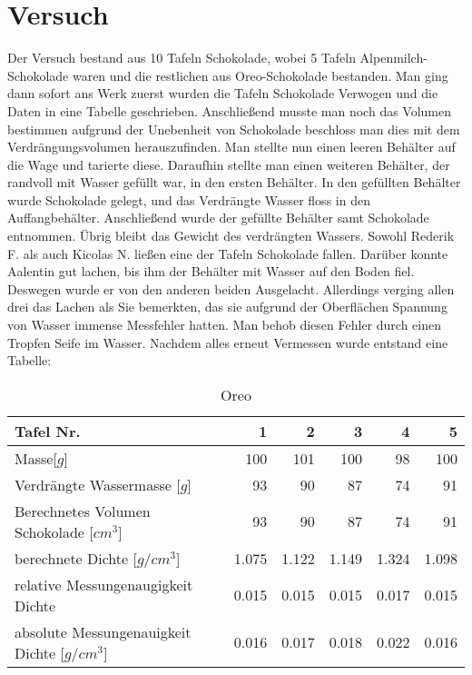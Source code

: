 \documentclass[12pt]{scrartcl}
\begin{document}
\section{Versuch}
Der Versuch bestand aus 10 Tafeln Schokolade, wobei 5 Tafeln Alpenmilch-Schokolade waren und die restlichen aus Oreo-Schokolade bestanden. Man ging dann sofort ans Werk zuerst wurden die Tafeln Schokolade Verwogen und die Daten in eine Tabelle geschrieben. Anschließend musste man noch das Volumen bestimmen aufgrund der Unebenheit von Schokolade beschloss man dies mit dem Verdrängungsvolumen herauszufinden. Man stellte nun einen leeren Behälter auf die Wage und tarierte diese. Daraufhin stellte man einen weiteren Behälter, der randvoll mit Wasser gefüllt war, in den ersten Behälter. In den gefüllten Behälter wurde Schokolade gelegt, und das Verdrängte Wasser floss in den Auffangbehälter. Anschließend wurde der gefüllte Behälter samt Schokolade entnommen. Übrig bleibt das Gewicht des verdrängten Wassers. Sowohl Rederik F. als auch Kicolas N. ließen eine der Tafeln Schokolade fallen. Darüber konnte Aalentin gut lachen, bis ihm der Behälter mit Wasser auf den Boden fiel. Deswegen wurde er von den anderen beiden Ausgelacht. Allerdings verging allen drei das Lachen als Sie bemerkten, das sie aufgrund der Oberflächen Spannung von Wasser immense Messfehler hatten. Man behob diesen Fehler durch einen Tropfen Seife im Wasser. Nachdem alles erneut Vermessen wurde entstand eine Tabelle:
	\begin{table}[h!]
	  \center
	  \caption{Oreo}
      \label{tab:oreo}	  
      \begin{tabular}{l|r|r|r|r|r}
      \toprule
      Tafel Nr. & 1 & 2 & 3 & 4 & 5\\
      \midrule
      Masse[$g$] & 100 & 101 & 100 & 98 & 100\\
      \midrule
      Verdrängte Wassermasse [$g$] & 93 & 90 & 87 & 74 & 91\\
      \midrule
      Berechnetes Volumen Schokolade [$cm^3$] & 93 & 90 & 87 & 74 & 91\\
      \midrule
      berechnete Dichte [$g/cm^3$] & 1.075 & 1.122 & 1.149 & 1.324 & 1.098 \\
      \midrule
      relative Messungenaugigkeit Dichte & 0.015 & 0.015 & 0.015 & 0.017 & 0.015 \\
      \midrule
      absolute Messungenauigkeit Dichte [$g/cm^3$] & 0.016 & 0.017 & 0.018 & 0.022 & 0.016 \\
      \bottomrule
      \end{tabular}
	\end{table}
\end{document}
